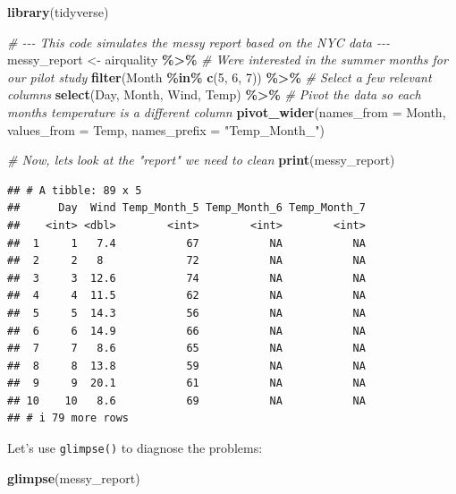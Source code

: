 \documentclass[
  11pt,
]{article}
\newenvironment{Shaded}{\begin{snugshade}}{\end{snugshade}}
\newcommand{\AttributeTok}[1]{\textcolor[rgb]{0.13,0.29,0.53}{#1}}
\newcommand{\CommentTok}[1]{\textcolor[rgb]{0.56,0.35,0.01}{\textit{#1}}}
\newcommand{\DecValTok}[1]{\textcolor[rgb]{0.00,0.00,0.81}{#1}}
\newcommand{\FunctionTok}[1]{\textcolor[rgb]{0.13,0.29,0.53}{\textbf{#1}}}
\newcommand{\NormalTok}[1]{#1}
\newcommand{\OtherTok}[1]{\textcolor[rgb]{0.56,0.35,0.01}{#1}}
\newcommand{\SpecialCharTok}[1]{\textcolor[rgb]{0.81,0.36,0.00}{\textbf{#1}}}
\newcommand{\StringTok}[1]{\textcolor[rgb]{0.31,0.60,0.02}{#1}}
\begin{document}
\begin{Shaded}
\begin{Highlighting}[]
\FunctionTok{library}\NormalTok{(tidyverse)}

\CommentTok{\# {-}{-}{-} This code simulates the messy report based on the NYC data {-}{-}{-}}
\NormalTok{messy\_report }\OtherTok{\textless{}{-}}\NormalTok{ airquality }\SpecialCharTok{\%\textgreater{}\%}
  \CommentTok{\# We\textquotesingle{}re interested in the summer months for our pilot study}
  \FunctionTok{filter}\NormalTok{(Month }\SpecialCharTok{\%in\%} \FunctionTok{c}\NormalTok{(}\DecValTok{5}\NormalTok{, }\DecValTok{6}\NormalTok{, }\DecValTok{7}\NormalTok{)) }\SpecialCharTok{\%\textgreater{}\%}
  \CommentTok{\# Select a few relevant columns}
  \FunctionTok{select}\NormalTok{(Day, Month, Wind, Temp) }\SpecialCharTok{\%\textgreater{}\%}
  \CommentTok{\# Pivot the data so each month\textquotesingle{}s temperature is a different column}
  \FunctionTok{pivot\_wider}\NormalTok{(}\AttributeTok{names\_from =}\NormalTok{ Month, }\AttributeTok{values\_from =}\NormalTok{ Temp, }\AttributeTok{names\_prefix =} \StringTok{"Temp\_Month\_"}\NormalTok{)}

\CommentTok{\# Now, let\textquotesingle{}s look at the "report" we need to clean}
\FunctionTok{print}\NormalTok{(messy\_report)}
\end{Highlighting}
\end{Shaded}

\begin{verbatim}
## # A tibble: 89 x 5
##      Day  Wind Temp_Month_5 Temp_Month_6 Temp_Month_7
##    <int> <dbl>        <int>        <int>        <int>
##  1     1   7.4           67           NA           NA
##  2     2   8             72           NA           NA
##  3     3  12.6           74           NA           NA
##  4     4  11.5           62           NA           NA
##  5     5  14.3           56           NA           NA
##  6     6  14.9           66           NA           NA
##  7     7   8.6           65           NA           NA
##  8     8  13.8           59           NA           NA
##  9     9  20.1           61           NA           NA
## 10    10   8.6           69           NA           NA
## # i 79 more rows
\end{verbatim}

Let's use \texttt{glimpse()} to diagnose the problems:

\begin{Shaded}
\begin{Highlighting}[]
\FunctionTok{glimpse}\NormalTok{(messy\_report)}
\end{Highlighting}
\end{Shaded}
\end{document}
